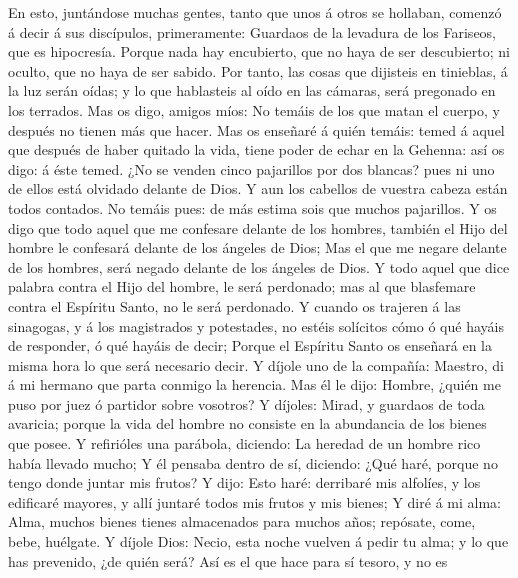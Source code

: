  En esto, juntándose muchas gentes, tanto que unos á otros
se hollaban, comenzó á decir á sus discípulos, primeramente: Guardaos de
la levadura de los Fariseos, que es hipocresía.  Porque nada
hay encubierto, que no haya de ser descubierto; ni oculto, que no haya
de ser sabido.  Por tanto, las cosas que dijisteis en
tinieblas, á la luz serán oídas; y lo que hablasteis al oído en las
cámaras, será pregonado en los terrados.  Mas os digo,
amigos míos: No temáis de los que matan el cuerpo, y después no tienen
más que hacer.  Mas os enseñaré á quién temáis: temed á
aquel que después de haber quitado la vida, tiene poder de echar en la
Gehenna: así os digo: á éste temed.  ¿No se venden cinco
pajarillos por dos blancas? pues ni uno de ellos está olvidado delante
de Dios.  Y aun los cabellos de vuestra cabeza están todos
contados. No temáis pues: de más estima sois que muchos pajarillos.
 Y os digo que todo aquel que me confesare delante de los
hombres, también el Hijo del hombre le confesará delante de los ángeles
de Dios;  Mas el que me negare delante de los hombres, será
negado delante de los ángeles de Dios.  Y todo aquel que
dice palabra contra el Hijo del hombre, le será perdonado; mas al que
blasfemare contra el Espíritu Santo, no le será perdonado. 
Y cuando os trajeren á las sinagogas, y á los magistrados y potestades,
no estéis solícitos cómo ó qué hayáis de responder, ó qué hayáis de
decir;  Porque el Espíritu Santo os enseñará en la misma
hora lo que será necesario decir.  Y díjole uno de la
compañía: Maestro, di á mi hermano que parta conmigo la herencia.
 Mas él le dijo: Hombre, ¿quién me puso por juez ó partidor
sobre vosotros?  Y díjoles: Mirad, y guardaos de toda
avaricia; porque la vida del hombre no consiste en la abundancia de los
bienes que posee.  Y refirióles una parábola, diciendo: La
heredad de un hombre rico había llevado mucho;  Y él
pensaba dentro de sí, diciendo: ¿Qué haré, porque no tengo donde juntar
mis frutos?  Y dijo: Esto haré: derribaré mis alfolíes, y
los edificaré mayores, y allí juntaré todos mis frutos y mis bienes;
 Y diré á mi alma: Alma, muchos bienes tienes almacenados
para muchos años; repósate, come, bebe, huélgate.  Y díjole
Dios: Necio, esta noche vuelven á pedir tu alma; y lo que has prevenido,
¿de quién será?  Así es el que hace para sí tesoro, y no es
